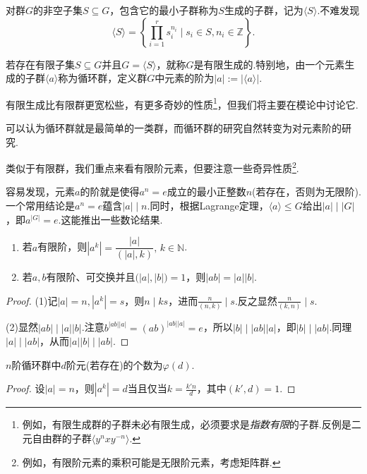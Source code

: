 \begin{definition}
	对群$G$的非空子集$S\subseteq G$，包含它的最小子群称为$S${\heiti 生成的子群}，记为$\langle S\rangle$.不难发现
	\[
		\langle S\rangle=\left\{\prod_{i=1}^rs_i^{n_i}\mid s_i\in S,n_i\in\mathbb{Z}\right\}.
	\]

	若存在有限子集$S\subseteq G$并且$G=\langle S\rangle$，就称$G$是{\heiti 有限生成的}.特别地，由一个元素生成的子群$\langle a\rangle$称为{\heiti 循环群}，定义群$G$中元素的{\heiti 阶}为$|a|:=|\langle a\rangle|$.
\end{definition}
\begin{remark}
	有限生成比有限群更宽松些，有更多奇妙的性质\footnote{例如，有限生成群的子群未必有限生成，必须要求是\emph{指数有限}的子群.反例是二元自由群的子群$\langle y^nxy^{-n}\rangle$.}，但我们将主要在模论中讨论它.
\end{remark}

可以认为循环群就是最简单的一类群，而循环群的研究自然转变为对元素阶的研究.

类似于有限群，我们重点来看有限阶元素，但要注意一些奇异性质\footnote{例如，有限阶元素的乘积可能是无限阶元素，考虑矩阵群.}.

容易发现，元素$a$的阶就是使得$a^n=e$成立的最小正整数$n$(若存在，否则为无限阶).一个常用结论是$a^n=e$蕴含$|a|\mid n$.同时，根据Lagrange定理，$\langle a\rangle \le G$给出$|a|\mid|G|$，即$a^{|G|}=e$.这能推出一些数论结果.
\begin{prop}
	\begin{enumerate}
		\item 若$a$有限阶，则$|a^k|=\dfrac{|a|}{(|a|,k)},\,k\in\mathbb{N}$.
		\item 若$a,b$有限阶、可交换并且$\big(|a|,|b|\big)=1$，则$|ab|=|a||b|$.
	\end{enumerate}
\end{prop}
\begin{proof}
	\hspace*{5.4pt}(1)记$|a|=n,|a^k|=s$，则$n\mid ks$，进而$\frac{n}{(n,k)}\mid s$.反之显然$\frac{n}{(k,n)}\mid s$.

	(2)显然$|ab|\mid|a||b|$.注意$b^{|ab||a|}=(ab)^{|ab||a|}=e$，所以$|b|\mid |ab||a|$，即$|b|\mid|ab|$.同理$|a|\mid|ab|$，从而$|a||b|\mid|ab|$.
\end{proof}
\begin{cor}
	$n$阶循环群中$d$阶元(若存在)的个数为$\varphi(d)$.
\end{cor}
\begin{proof}
	设$|a|=n$，则$|a^k|=d$当且仅当$k=\frac{k'n}{d}$，其中$(k',d)=1$.
\end{proof}

